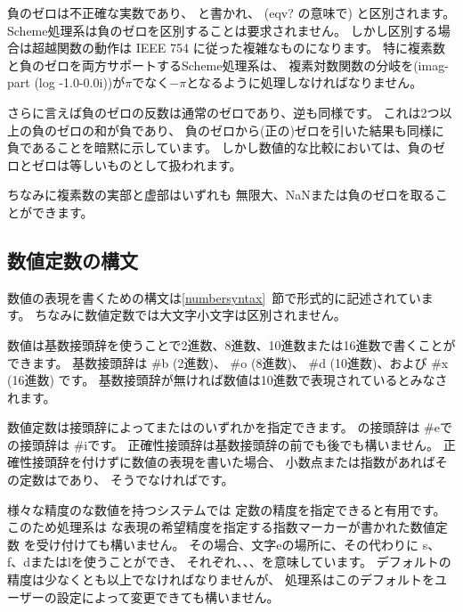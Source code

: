 負のゼロは不正確な実数であり、{} と書かれ、
({\cf eqv?} の意味で) {} と区別されます。
Scheme処理系は負のゼロを区別することは要求されません。
しかし区別する場合は超越関数の動作は IEEE 754 に従った複雑なものになります。
特に複素数と負のゼロを両方サポートするScheme処理系は、
複素対数関数の分岐を{\cf (imag-part (log -1.0-0.0i))}が$\pi$でなく$-\pi$となるように処理しなければなりません。

さらに言えば負のゼロの反数は通常のゼロであり、逆も同様です。
これは2つ以上の負のゼロの和が負であり、
負のゼロから(正の)ゼロを引いた結果も同様に負であることを暗黙に示しています。
しかし数値的な比較においては、負のゼロとゼロは等しいものとして扱われます。

ちなみに複素数の実部と虚部はいずれも
無限大、NaNまたは負のゼロを取ることができます。

\subsection{数値定数の構文}
\label{numbernotations}

数値の表現を書くための構文は\ref{numbersyntax}~節で形式的に記述されています。
ちなみに数値定数では大文字小文字は区別されません。

数値は基数接頭辞を使うことで2進数、8進数、10進数または16進数で書くことができます。
基数接頭辞は %
{\cf \#b} (2進数)、
{\cf \#o} (8進数)、
{\cf \#d} (10進数)、および %
{\cf \#x} (16進数) です。
基数接頭辞が無ければ数値は10進数で表現されているとみなされます。

数値定数は接頭辞によってまたはのいずれかを指定できます。
の接頭辞は {\cf \#e}で
の接頭辞は {\cf \#i}です。
正確性接頭辞は基数接頭辞の前でも後でも構いません。
正確性接頭辞を付けずに数値の表現を書いた場合、
小数点または指数があればその定数はであり、
そうでなければです。

様々な精度のな数値を持つシステムでは
定数の精度を指定できると有用です。
このため処理系は
な表現の希望精度を指定する指数マーカーが書かれた数値定数
を受け付けても構いません。
その場合、文字{\cf e}の場所に、その代わりに
{\cf s}、{\cf f}、{\cf d}または{\cf l}を使うことができ、
それぞれ、、、を意味しています。
デフォルトの精度は少なくとも以上でなければなりませんが、
処理系はこのデフォルトをユーザーの設定によって変更できても構いません。

